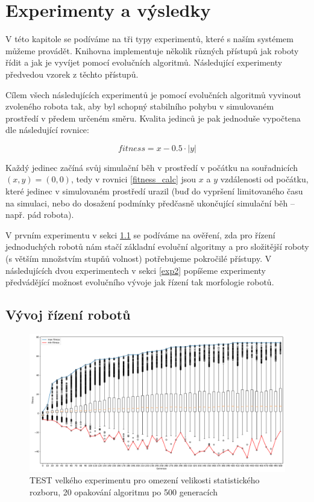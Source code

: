 \chapter{Experimenty a výsledky}

V této kapitole se podíváme na tři typy experimentů, které s naším systémem
můžeme provádět. Knihovna implementuje několik různých přístupů jak roboty
řídit a jak je vyvíjet pomocí evolučních algoritmů. Následující experimenty
předvedou vzorek z těchto přístupů. 

Cílem všech následujících experimentů je pomocí evolučních algoritmů vyvinout
zvoleného robota tak, aby byl schopný stabilního pohybu v simulovaném prostředí
v předem určeném směru. Kvalita jedinců je pak jednoduše vypočtena dle
následující rovnice:

\begin{equation} \label{fitness_calc}
    fitness = x - 0.5\cdot|y|
\end{equation}

Každý jedinec začíná svůj simulační běh v prostředí v počátku na souřadnicích
$(x,y) = (0,0)$, tedy v rovnici \ref{fitness_calc} jsou $x$ a $y$ vzdálenosti
od počátku, které jedinec v simulovaném prostředí urazil (buď do vypršení
limitovaného času na simulaci, nebo do dosažení podmínky předčasně ukončující
simulační běh -- např. pád robota).

V prvním experimentu v sekci \ref{exp1} se podíváme na ověření, zda pro řízení
jednoduchých robotů nám stačí základní evoluční algoritmy a pro složitější
roboty (s větším množstvím stupňů volnost) potřebujeme pokročilé přístupy.
V následujících dvou experimentech v sekci \ref{exp2} popíšeme experimenty
předvádějící možnost evolučního vývoje jak řízení tak morfologie robotů.

\section{Vývoj řízení robotů} \label{exp1}

\begin{figure}[!htb]
    \centering
    \includegraphics[width=1\textwidth]{../img/BIGexperiment1_TFS_10ticks.pdf}
    \caption{TEST velkého experimentu pro omezení velikosti statistického
    rozboru, 20 opakování algoritmu po 500 generacích}
\end{figure}

